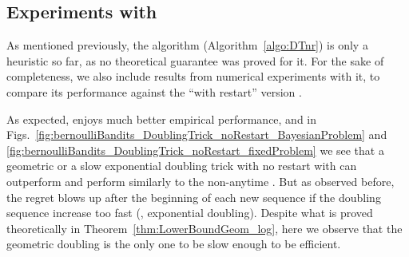 \documentclass[12pt]{colt2018} %
\begin{document}


\subsection{Experiments with \DTnr}\label{sub:experimentsDTnr}

As mentioned previously, the \DTnr{} algorithm (Algorithm~\ref{algo:DTnr})
is only a heuristic so far, as no theoretical guarantee was proved for it.
%
For the sake of completeness, we also include results from numerical experiments with it, to compare its performance against the ``with restart'' version \DTr.

As expected, \DTnr{} enjoys much better empirical performance,
and in Figs.~\ref{fig:bernoulliBandits_DoublingTrick_noRestart_BayesianProblem} and \ref{fig:bernoulliBandits_DoublingTrick_noRestart_fixedProblem} we see that a geometric or a slow exponential doubling trick with no restart with \KLUCBpp{} can outperform \KLUCB{} and perform similarly to the non-anytime \KLUCBpp.
%
But as observed before, the regret blows up after the beginning of each new sequence if the doubling sequence increase too fast (\eg, exponential doubling).
Despite what is proved theoretically in Theorem~\ref{thm:LowerBoundGeom_log}, here we observe that the geometric doubling is the only one to be slow enough to be efficient.
\end{document}
